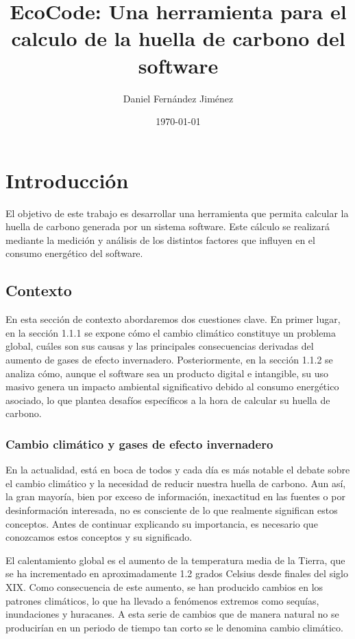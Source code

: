 \documentclass[12pt,a4paper]{report}
\title{EcoCode: Una herramienta para el calculo de la huella de carbono del software}
\author{Daniel Fernández Jiménez}
\date{\today}
\begin{document}
\maketitle

\tableofcontents
\newpage

\chapter{Introducción}

El objetivo de este trabajo es desarrollar una herramienta que permita calcular
la huella de carbono generada por un sistema software. Este cálculo se
realizará mediante la medición y análisis de los distintos factores que
influyen en el consumo energético del software.

\section{Contexto}

En esta sección de contexto abordaremos dos cuestiones clave. En primer lugar, en la sección 1.1.1 se expone cómo el cambio climático constituye un problema global, cuáles son sus causas y las principales consecuencias derivadas del aumento de gases de efecto invernadero. Posteriormente, en la sección 1.1.2 se analiza cómo, aunque el software sea un producto digital e intangible, su uso masivo genera un impacto ambiental significativo debido al consumo energético asociado, lo que plantea desafíos específicos a la hora de calcular su huella de carbono.

\subsection{Cambio climático y gases de efecto invernadero}

En la actualidad, está en boca de todos y cada día es más notable el debate
sobre el cambio climático y la necesidad de reducir nuestra huella de carbono.
Aun así, la gran mayoría, bien por exceso de información, inexactitud en las
fuentes o por desinformación interesada, no es consciente de lo que realmente
significan estos conceptos. Antes de continuar explicando su importancia, es
necesario que conozcamos estos conceptos y su significado.

El calentamiento global es el aumento de la temperatura media de la Tierra, que
se ha incrementado en aproximadamente 1.2 grados Celsius desde finales del
siglo XIX. Como consecuencia de este aumento, se han producido cambios en los
patrones climáticos, lo que ha llevado a fenómenos extremos como sequías,
inundaciones y huracanes. A esta serie de cambios que de manera natural no se
producirían en un periodo de tiempo tan corto se le denomina cambio climático.
\end{document}
